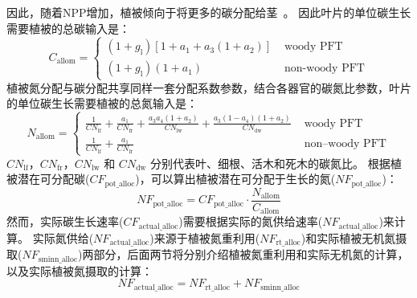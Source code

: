因此，随着${\mathrm {NPP}}$增加，植被倾向于将更多的碳分配给茎~\citep{allen2005,vanninen2005carbon}。
因此叶片的单位碳生长需要植被的总碳输入是：
\begin{equation}\label{C_allom}
  C_{\mathrm{allom }}=\begin{cases}
    \left(1+g_{\mathrm{l}}\right)\left[1+a_{1}+a_{3}\left(1+a_{2}\right)\right] &  \text{ woody PFT} \\
    \left(1+g_{\mathrm{l}}\right)\left(1+a_{1}\right)  &  \text{ non-woody PFT}
  \end{cases}
\end{equation}
植被氮分配与碳分配共享同样一套分配系数参数，结合各器官的碳氮比参数，叶片的单位碳生长需要植被的总氮输入是：
\begin{equation}\label{N_allom}
  N_{\mathrm{ {allom }}}= \begin{cases}
    \frac{1}{CN_{\mathrm{ {lf }}}}+\frac{a_{1}}{CN_{\mathrm{ {fr }}}}+\frac{a_{3} a_{4}\left(1+a_{2}\right)}
    {CN_{\mathrm{l w}}}+\frac{a_{3}\left(1-a_{4}\right)\left(1+a_{2}\right)}{CN_{\mathrm{d w}}}  &  \text { woody PFT} \\
    \frac{1}{CN_{\mathrm{ {lf }}}}+\frac{a_{1}}{CN_{\mathrm{ {fr }}}} & \text { non--woody PFT}
  \end{cases}
\end{equation}
$CN_{\mathrm{lf}}$，$CN_{\mathrm{fr}}$，$CN_{\mathrm{lw}}$ 和 $CN_{\mathrm{dw}}$ 分别代表叶、细根、活木和死木的碳氮比。
根据植被潜在可分配碳($CF_{\mathrm{pot\_{alloc}}}$)，可以算出植被潜在可分配于生长的氮($NF_{\mathrm{pot\_{alloc}}}$)：
\begin{equation}
  N F_{\mathrm{ {pot\_{alloc}}}}=CF_{\mathrm{ {pot\_{alloc }}}} \cdot \frac{N_{\mathrm{ {allom }}}}{C_{\mathrm{ {allom }}}}
\end{equation}
然而，实际碳生长速率($CF_{\mathrm{actual\_{alloc}}}$)需要根据实际的氮供给速率($NF_{\mathrm{actual\_{alloc}}}$)来计算。
实际氮供给($NF_{\mathrm{actual\_{alloc}}}$)来源于植被氮重利用($NF_{\mathrm{rt\_{alloc}}}$)和实际植被无机氮摄取($NF_{\mathrm{sminn\_{alloc}}}$)两部分，后面两节将分别介绍植被氮重利用和实际无机氮的计算，以及实际植被氮摄取的计算：
\begin{equation}\label{NF_actual_alloc}
  NF_{\mathrm{actual\_{alloc}}}=NF_{\mathrm{rt\_{alloc}}}+NF_{\mathrm{sminn\_{alloc}}}
\end{equation}


